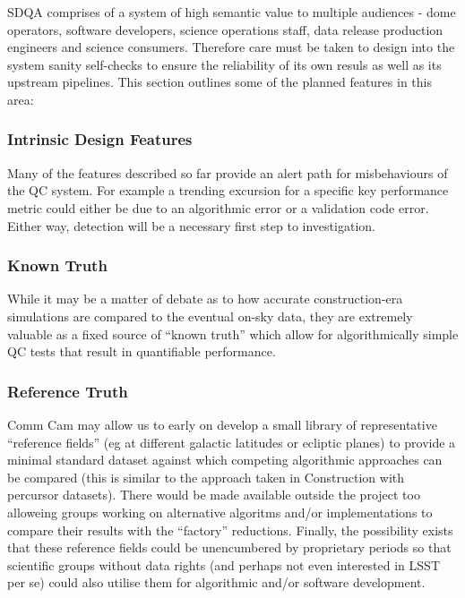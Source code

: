\documentclass[DM,toc,lsstdraft]{lsstdoc}
\begin{document}
SDQA comprises of a system of high semantic value to multiple
audiences - dome operators, software developers, science operations
staff, data release production engineers and science
consumers. Therefore care must be taken to design into the system
sanity self-checks to ensure the reliability of its own resuls as well
as its upstream pipelines. This section outlines some of the planned
features in this area:

\subsubsection{Intrinsic Design Features}

Many of the features described so far provide an alert path for misbehaviours of the QC system. For example a trending excursion for a specific key performance metric could either be due to an algorithmic error or a validation code error. Either way, detection will be a necessary first step to investigation.

\subsubsection{Known Truth}

While it may be a matter of debate as to how accurate construction-era simulations are compared to the eventual on-sky data, they are extremely valuable as a fixed source of ``known truth'' which allow for algorithmically simple QC tests that result in quantifiable performance.

\subsubsection{Reference Truth}

Comm Cam may allow us to early on develop a small library of representative ``reference fields'' (eg at different galactic latitudes or ecliptic planes) to provide a minimal standard dataset against which competing algorithmic approaches can be compared (this is similar to the approach taken in Construction with percursor datasets). There would be made available outside the project too alloweing groups working on alternative algoritms and/or implementations to compare their results with the ``factory'' reductions. Finally, the possibility exists that these reference fields could be unencumbered by proprietary periods so that scientific groups without data rights (and perhaps not even interested in LSST per se) could also utilise them for algorithmic and/or software development.


\end{document}
